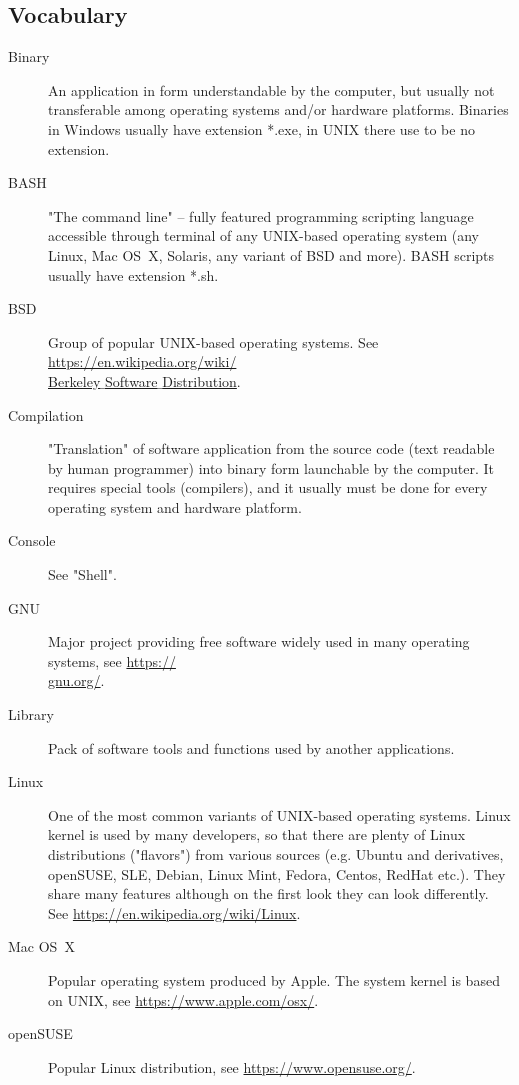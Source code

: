 \documentclass[a4paper, 11pt, twoside]{article}
\begin{document}
\subsection{Vocabulary}
\label{vocabulary}

\begin{description}
\item[Binary] An application in form understandable by the computer, but usually not transferable among operating systems and/or hardware platforms. Binaries in Windows usually have extension *.exe, in UNIX there use to be no extension.
\item[BASH] "The command line" -- fully featured programming scripting language accessible through terminal of any UNIX-based operating system (any Linux, Mac OS~X, Solaris, any variant of BSD and more). BASH scripts usually have extension *.sh.
\item[BSD] Group of popular UNIX-based operating systems. See \href{https://en.wikipedia.org/wiki/Berkeley_Software_Distribution}{https://en.wikipedia.org/wiki/\\Berkeley$\_$Software$\_$Distribution}.
\item[Compilation] "Translation" of software application from the source code (text readable by human programmer) into binary form launchable by the computer. It requires special tools (compilers), and it usually must be done for every operating system and hardware platform.
\item[Console] See "Shell".
\item[GNU] Major project providing free software widely used in many operating systems, see \href{https://gnu.org/}{https://\\gnu.org/}.
\item[Library] Pack of software tools and functions used by another applications.
\item[Linux] One of the most common variants of UNIX-based operating systems. Linux kernel is used by many developers, so that there are plenty of Linux distributions ("flavors") from various sources (e.g. Ubuntu and derivatives, openSUSE, SLE, Debian, Linux Mint, Fedora, Centos, RedHat etc.). They share many features although on the first look they can look differently. See \href{https://en.wikipedia.org/wiki/Linux}{https://en.wikipedia.org/wiki/Linux}.
\item[Mac OS~X] Popular operating system produced by Apple. The system kernel is based on UNIX, see \href{https://www.apple.com/osx/}{https://www.apple.com/osx/}.
\item[openSUSE] Popular Linux distribution, see \href{https://www.opensuse.org/}{https://www.opensuse.org/}.

\end{description}
\end{document}
